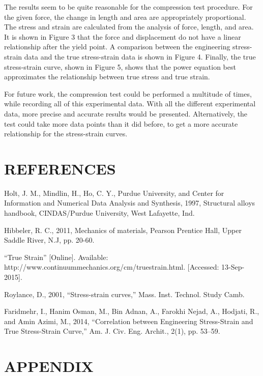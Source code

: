 \documentclass[12pt]{article}
\begin{document}
The results seem to be quite reasonable for the compression test procedure. For the given force, the change in length and area are appropriately proportional. The stress and strain are calculated from the analysis of force, length, and area. It is shown in Figure 3 that the force and displacement do not have a linear relationship after the yield point. A comparison between the engineering stress-strain data and the true stress-strain data is shown in Figure 4. Finally, the true stress-strain curve, shown in Figure 5, shows that the power equation best approximates the relationship between true stress and true strain.
\bigskip

For future work, the compression test could be performed a multitude of times, while recording all of this experimental data. With all the different experimental data, more precise and accurate results would be presented. Alternatively, the test could take more data points than it did before, to get a more accurate relationship for the stress-strain curves. 





\section*{\fontsize{12}{12}\selectfont REFERENCES}

\begin{thebibliography}{2}

  Holt, J. M., Mindlin, H., Ho, C. Y., Purdue University, and Center for Information and Numerical Data Analysis and Synthesis, 1997, Structural alloys handbook, CINDAS/Purdue University, West Lafayette, Ind.
  
  
\vspace{-0.15in}  
  Hibbeler, R. C., 2011, Mechanics of materials, Pearson Prentice Hall, Upper Saddle River, N.J, pp. 20-60.
  

\vspace{-0.15in}
  “True Strain” [Online]. Available: http://www.continuummechanics.org/cm/truestrain.html. [Accessed: 13-Sep-2015].
  

\vspace{-0.15in}
  Roylance, D., 2001, “Stress-strain curves,” Mass. Inst. Technol. Study Camb.
  
  
\vspace{-0.15in}
  Faridmehr, I., Hanim Osman, M., Bin Adnan, A., Farokhi Nejad, A., Hodjati, R., and Amin Azimi, M., 2014, “Correlation between Engineering Stress-Strain and True Stress-Strain Curve,” Am. J. Civ. Eng. Archit., 2(1), pp. 53–59.


\end{thebibliography}



\pagebreak



\section*{\fontsize{12}{12}\selectfont APPENDIX}

\end{document}
